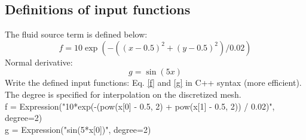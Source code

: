 \documentclass[12pt,3p]{article}
\begin{document}
\subsection{Definitions of input functions}
The fluid source term is defined below: 
\begin{equation}\label{f}
f = 10 \exp (-((x-0.5)^2 +(y -0.5)^2)/0.02)
\end{equation}
Normal derivative: 
\begin{equation}\label{g}
g = \sin (5x)
\end{equation}
Write the defined input functions: Eq. \ref{f} and \ref{g} in C++ syntax (more efficient). The degree is specified for interpolation on the discretized mesh. \\
{\selectfont
f = Expression("10*exp(-(pow(x[0] - 0.5, 2) + pow(x[1] - 0.5, 2)) / 0.02)", degree=2) \\
g = Expression("sin(5*x[0])", degree=2)
}
\end{document}
